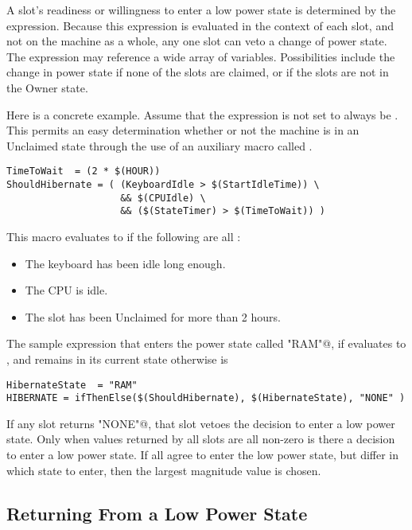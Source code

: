 A slot's readiness or willingness to enter a low power state is 
determined by the  expression. 
Because this expression is evaluated in the context of each slot,
and not on the machine as a whole, 
any one slot can veto a change of power state.  
The  expression may reference a wide array of variables.
Possibilities include the change in power state if 
none of the slots are claimed, or if the slots are not in the
Owner state.

Here is a concrete example.
Assume that the  expression is not set to always be .
This permits an easy determination whether or not
the machine is in an Unclaimed state through the use of
an auxiliary macro called .

\footnotesize
\begin{verbatim}
TimeToWait 	= (2 * $(HOUR))
ShouldHibernate = ( (KeyboardIdle > $(StartIdleTime)) \
                    && $(CPUIdle) \
                    && ($(StateTimer) > $(TimeToWait)) )
\end{verbatim}
\normalsize

This macro evaluates to  if the following are all :
\begin{itemize}
\item The keyboard has been idle long enough.
\item The CPU is idle.
\item The slot has been Unclaimed for more than 2 hours.
\end{itemize}

The sample  expression 
that enters the power state called \verb@"RAM"@, if
\MacroNI{ShouldHibernate} evaluates to ,
and remains in its current state otherwise is

\footnotesize
\begin{verbatim}
HibernateState 	= "RAM"
HIBERNATE = ifThenElse($(ShouldHibernate), $(HibernateState), "NONE" )
\end{verbatim}
\normalsize

If any slot returns \verb@"NONE"@,
that slot vetoes the decision to enter a low power state.
Only when values returned by all slots are all non-zero 
is there a decision to enter a low power state.
If all agree to enter the low power state, but differ in which state to enter,
then the largest magnitude value is chosen. 


\subsection{Returning From a Low Power State}

